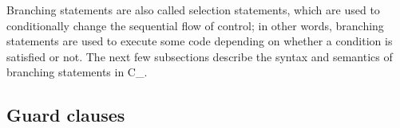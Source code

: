 \def\Subsection#1{\subsection{#1}}

Branching statements are also called selection statements,
which are used to conditionally change the sequential flow of control;
in other words, branching statements are used to execute some
code depending on whether a condition is satisfied or not.
The next few subsections describe the syntax
and semantics of branching statements in C\_.

\Subsection{Guard clauses}

\subsection{}


\subsection{}


\subsection{}


\subsection{}


\subsection{}


\subsection{}


\subsection{}

